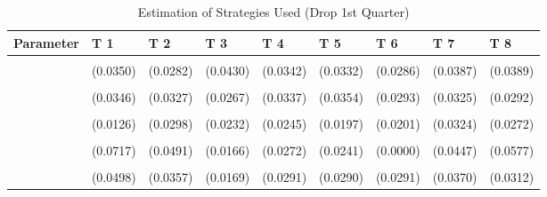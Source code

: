\begin{table}[!h]
\centering
\caption{Estimation of Strategies Used (Drop 1st Quarter)}
\centering
\begin{tabular}[t]{lllllllll}
\toprule
Parameter & T 1 & T 2 & T 3 & T 4 & T 5 & T 6 & T 7 & T 8\\
\midrule
\cellcolor{gray!10}{gamma} & \cellcolor{gray!10}{0.7458***} & \cellcolor{gray!10}{0.6457***} & \cellcolor{gray!10}{0.7108***} & \cellcolor{gray!10}{0.7373***} & \cellcolor{gray!10}{0.6736***} & \cellcolor{gray!10}{0.7589***} & \cellcolor{gray!10}{0.7348***} & \cellcolor{gray!10}{0.7863***}\\
 & (0.0350) & (0.0282) & (0.0430) & (0.0342) & (0.0332) & (0.0286) & (0.0387) & (0.0389)\\
\cellcolor{gray!10}{AD} & \cellcolor{gray!10}{0.4393***} & \cellcolor{gray!10}{0.3230***} & \cellcolor{gray!10}{0.7858***} & \cellcolor{gray!10}{0.6459***} & \cellcolor{gray!10}{0.7239***} & \cellcolor{gray!10}{0.6771***} & \cellcolor{gray!10}{0.3106***} & \cellcolor{gray!10}{0.3197***}\\
 & (0.0346) & (0.0327) & (0.0267) & (0.0337) & (0.0354) & (0.0293) & (0.0325) & (0.0292)\\
\cellcolor{gray!10}{AC} & \cellcolor{gray!10}{0.0015} & \cellcolor{gray!10}{0.1649***} & \cellcolor{gray!10}{0.1107***} & \cellcolor{gray!10}{0.1224***} & \cellcolor{gray!10}{0.0897***} & \cellcolor{gray!10}{0.1045***} & \cellcolor{gray!10}{0.1947***} & \cellcolor{gray!10}{0.1518***}\\
\addlinespace
 & (0.0126) & (0.0298) & (0.0232) & (0.0245) & (0.0197) & (0.0201) & (0.0324) & (0.0272)\\
\cellcolor{gray!10}{G} & \cellcolor{gray!10}{0.1618*} & \cellcolor{gray!10}{0.2279***} & \cellcolor{gray!10}{0.0192} & \cellcolor{gray!10}{0.0681*} & \cellcolor{gray!10}{0.0344} & \cellcolor{gray!10}{0.0000} & \cellcolor{gray!10}{0.1735***} & \cellcolor{gray!10}{0.3065***}\\
 & (0.0717) & (0.0491) & (0.0166) & (0.0272) & (0.0241) & (0.0000) & (0.0447) & (0.0577)\\
\cellcolor{gray!10}{TFT} & \cellcolor{gray!10}{0.3091***} & \cellcolor{gray!10}{0.1157**} & \cellcolor{gray!10}{0.0278} & \cellcolor{gray!10}{0.1061***} & \cellcolor{gray!10}{0.1075***} & \cellcolor{gray!10}{0.1202***} & \cellcolor{gray!10}{0.1932***} & \cellcolor{gray!10}{0.1239***}\\
 & (0.0498) & (0.0357) & (0.0169) & (0.0291) & (0.0290) & (0.0291) & (0.0370) & (0.0312)\\

\end{tabular}
\end{table}
